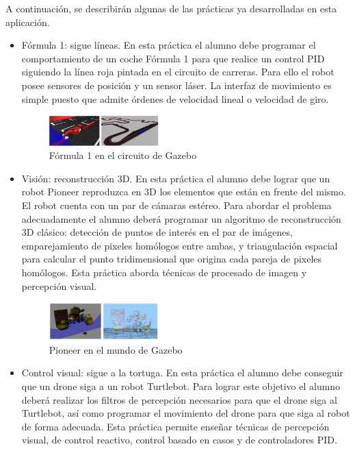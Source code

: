 A continuación, se describirán algunas de las prácticas ya desarrolladas en esta aplicación.

\begin{itemize}
\item Fórmula 1: sigue líneas. En esta práctica el alumno debe programar el comportamiento de un coche Fórmula 1 para que realice un control PID siguiendo la línea roja pintada en el circuito de carreras. Para ello el robot posee sensores de posición y un sensor láser. La interfaz de movimiento es simple puesto que admite órdenes de velocidad lineal o velocidad de giro.
\begin{figure}[H]
  \begin{center}
    \includegraphics[width=0.4\textwidth]{figures/Introduccion/F1.png}
		\caption{Fórmula 1 en el circuito de Gazebo}
		\label{fig.F1}
		\end{center}
\end{figure}
\item Visión: reconstrucción 3D. En esta práctica el alumno debe lograr que un robot Pioneer reproduzca en 3D los elementos que están en frente del mismo. El robot cuenta con un par de cámaras estéreo. Para abordar el problema adecuadamente el alumno deberá programar un algoritmo de reconstrucción 3D clásico: detección de puntos de interés en el par de imágenes, emparejamiento de pixeles homólogos entre ambas, y triangulación espacial para calcular el punto tridimensional que origina cada pareja de pixeles homólogos. Esta práctica aborda técnicas de procesado de imagen y percepción visual.
\begin{figure}[H]
  \begin{center}
    \includegraphics[width=0.4\textwidth]{figures/Introduccion/3D.png}
		\caption{Pioneer en el mundo de Gazebo}
		\label{fig.3D}
		\end{center}
\end{figure}
\item Control visual: sigue a la tortuga. En esta práctica el alumno debe conseguir que un drone siga a un robot Turtlebot. Para lograr este objetivo el alumno deberá realizar los filtros de percepción necesarios para que el drone siga al Turtlebot, así como programar el movimiento del drone para que siga al robot de forma adecuada. Esta práctica permite enseñar técnicas de percepción visual, de control reactivo, control basado en casos y de controladores PID.

\end{itemize}
